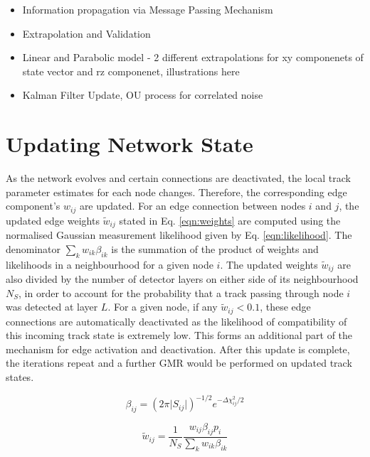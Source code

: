 \begin{itemize}
    \item Information propagation via Message Passing Mechanism
    \item Extrapolation and Validation
    \item Linear and Parabolic model - 2 different extrapolations for xy componenets of state vector and rz componenet, illustrations here
    \item Kalman Filter Update, OU process for correlated noise
\end{itemize}




\section{Updating Network State}
\label{gnn-updating-network-state}

As the network evolves and certain connections are deactivated, the local track parameter estimates for each node changes. Therefore, the corresponding edge component's $w_{ij}$ are updated. For an edge connection between nodes $i$ and $j$, the updated edge weights $\widetilde{w}_{ij}$ stated in Eq. \eqref{eqn:weights} are computed using the normalised Gaussian measurement likelihood given by Eq. \eqref{eqn:likelihood}. The denominator $\sum_{k}w_{ik}\beta_{ik}$ is the summation of the product of weights and likelihoods in a neighbourhood for a given node $i$. The updated weights $\widetilde{w}_{ij}$ are also divided by the number of detector layers on either side of its neighbourhood $N_S$, in order to account for the probability that a track passing through node $i$ was detected at layer $L$. For a given node, if any $\widetilde{w}_{ij} < 0.1$, these edge connections are automatically deactivated as the likelihood of compatibility of this incoming track state is extremely low. This forms an additional part of the mechanism for edge activation and deactivation. After this update is complete, the iterations repeat and a further GMR would be performed on updated track states. 

\begin{equation}
\beta_{ij} = (2 \pi \lvert S_{ij} \rvert )^{-1/2}  e^{-\Delta \chi^{2}_{ij} / 2}
\label{eqn:likelihood}
\end{equation}

\begin{equation}
\widetilde{w}_{ij} = \frac{1}{N_S} \frac{w_{ij}\beta_{ij} p_i}{\sum_{k}w_{ik}\beta_{ik}}
\label{eqn:weights}
\end{equation}



